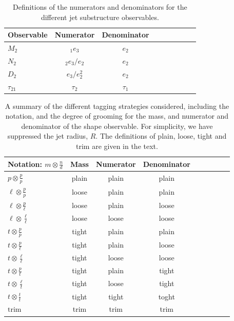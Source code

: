 \documentclass[11pt,letterpaper]{article}
\newcommand{\ecfnobeta}[1]{e_{#1}}
\newcommand{\ecfvarnobeta}[2]{{_{#1}e_{#2}}}
\begin{document}
\begin{table}
\begin{center}
\begin{tabular}{| l | c | c |c |c|c|c |c|r| }
  \hline                       
  Observable &  Numerator & Denominator \\
  \hline
  $M_2$ &   $\ecfvarnobeta{1}{3}$ & $ \ecfnobeta{2}$ \\
  $N_2$ &   $\ecfvarnobeta{2}{3} / \ecfnobeta{2} $ & $ \ecfnobeta{2}$ \\
  $D_2$ &   $\ecfnobeta{3} / \ecfnobeta{2}^2 $ & $ \ecfnobeta{2}$ \\
  $\tau_{21}$ &   $\tau_2$ & $\tau_1$ \\
  \hline  
\end{tabular}
\end{center}
\caption{
Definitions of the numerators and denominators for the different jet substructure observables.
}
\label{tab:dn}
\end{table}

\begin{table}[t!]
\begin{center}
\begin{tabular}{| l | c | c |c |c|c|c |c|r| }
  \hline                       
  Notation: $m \otimes \frac{n}{d}$ & Mass & Numerator & Denominator\\
  \hline
  $p \otimes \frac{p}{p}$ & plain  &  plain & plain \\
  $\ell \otimes \frac{p}{p}$ & loose  &  plain & plain \\
  $\ell \otimes \frac{p}{\ell}$ & loose  &  plain & loose \\
  $\ell \otimes \frac{\ell}{\ell}$ & loose  &  loose & loose \\
  $t \otimes \frac{p}{p}$ & tight  &  plain & plain \\
  $t \otimes \frac{p}{\ell}$ & tight  &  plain & loose \\
  $t \otimes \frac{\ell}{\ell}$ & tight  &  loose & loose \\
  $t \otimes \frac{p}{t}$ & tight  &  plain & tight \\
  $t \otimes \frac{\ell}{t}$ & tight  &  loose & tight \\
  $t \otimes \frac{t}{t}$ & tight  &  tight & toght \\
  \hline
  $\text{trim}$ & trim &  trim & trim \\
  \hline  
\end{tabular}
\end{center}
\caption{ A summary of the different tagging strategies considered,
  including the notation, and the degree of grooming for the mass, and
  numerator and denominator of the shape observable. For simplicity,
  we have suppressed the jet radius, $R$. The definitions of plain,
  loose, tight and trim are given in the text.}
\label{tab:tag_summary}
\end{table}
\end{document}
